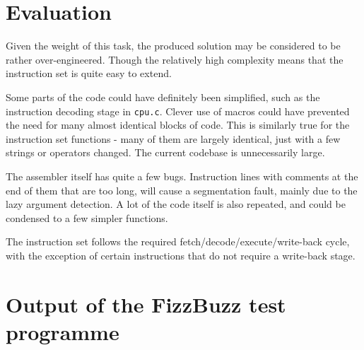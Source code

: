 \documentclass[a4paper,11pt]{article}
\begin{document}
\section{Evaluation}
    Given the weight of this task, the produced solution may be considered to be rather over-engineered. Though the relatively high complexity means that the instruction set is quite easy to extend.
    
    Some parts of the code could have definitely been simplified, such as the instruction decoding stage in \lstinline{cpu.c}. Clever use of macros could have prevented the need for many almost identical blocks of code. This is similarly true for the instruction set functions - many of them are largely identical, just with a few strings or operators changed. The current codebase is unnecessarily large.
    
    The assembler itself has quite a few bugs. Instruction lines with comments at the end of them that are too long, will cause a segmentation fault, mainly due to the lazy argument detection. A lot of the code itself is also repeated, and could be condensed to a few simpler functions.
    
    The instruction set follows the required fetch/decode/execute/write-back cycle, with the exception of certain instructions that do not require a write-back stage.
    
\newpage

\begin{appendices}
    \label{appendix}
    \section{Output of the FizzBuzz test programme}
    \label{dat:fizzbuzz}
\end{appendices}
\newpage



\end{document}
